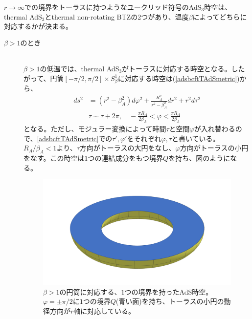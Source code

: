 $r\to \infty$での境界をトーラスに持つようなユークリッド符号のAdS$_3$時空は、thermal AdS$_3$とthermal non-rotating BTZの2つがあり、温度$\beta$によってどちらに対応するかが決まる。
\begin{description}
\item[$\beta>1$のとき] \hfill\\
$\beta>1$の低温では、thermal AdS$_3$がトーラスに対応する時空となる。したがって、円筒$[-\pi/2,\pi/2]\times S_{\beta}^1$に対応する時空は(\ref{adsbcftTAdSmetric})から、
\begin{align}
ds^2&=(r^2-\beta_A^2)d\varphi^2+\frac{R_A^2}{r^2-\beta_A^2}dr^2+r^2d\tau^2\\
&\tau\sim \tau+2\pi,\quad -\frac{\pi R_A}{2\beta_A}<\varphi <\frac{\pi R_A}{2\beta_A}
\end{align}
となる。ただし、モジュラー変換によって時間$\tau$と空間$\varphi$が入れ替わるので、\ref{adsbcftTAdSmetric}での$\tau',\varphi'$をそれぞれ$\varphi,\tau$と書いている。$R_A/\beta_A<1$より、$\tau$方向がトーラスの大円をなし、$\varphi$方向がトーラスの小円をなす。この時空は$1$つの連結成分をもつ境界$Q$を持ち、図のようになる。
\begin{figure}[h]
	\centering
	\includegraphics[width=0.7\linewidth]{adsbcftTAdS.pdf}
	\caption{$\beta>1$の円筒に対応する、$1$つの境界を持ったAdS時空。$\varphi=\pm\pi/2$に$1$つの境界$Q$(青い面)を持ち、トーラスの小円の動径方向が$r$軸に対応している。}
	\label{fig:adsbcfttads}
\end{figure}


\end{description}
